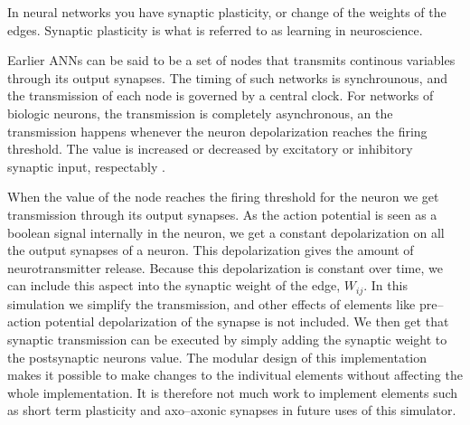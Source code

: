 	In neural networks you have synaptic plasticity, or change of the weights of the edges. Synaptic plasticity is what is referred to as learning in neuroscience. %


	Earlier ANNs can be said to be a set of nodes that transmits continous variables through its output synapses. The timing of such networks is synchrounous, and the transmission of each node is governed by a central clock.
	For networks of biologic neurons, the transmission is completely asynchronous, an the transmission happens whenever the neuron depolarization reaches the firing threshold.
	The value is increased or decreased by excitatory or inhibitory synaptic input, respectably .
	
	When the value of the node reaches the firing threshold for the neuron we get transmission through its output synapses.
	As the action potential is seen as a boolean signal internally in the neuron, we get a constant depolarization on all the output synapses of a neuron.
	This depolarization gives the amount of neurotransmitter release. 
	Because this depolarization is constant over time, we can include this aspect into the synaptic weight of the edge, $W_{ij}$.
	In this simulation we simplify the transmission, and other effects of elements like pre--action potential depolarization of the synapse is not included.%
	We then get that synaptic transmission can be executed by simply adding the synaptic weight to the postsynaptic neurons value.
	The modular design of this implementation makes it possible to make changes to the indivitual elements without affecting the whole implementation.
	It is therefore not much work to implement elements such as short term plasticity and axo--axonic synapses in future uses of this simulator.

